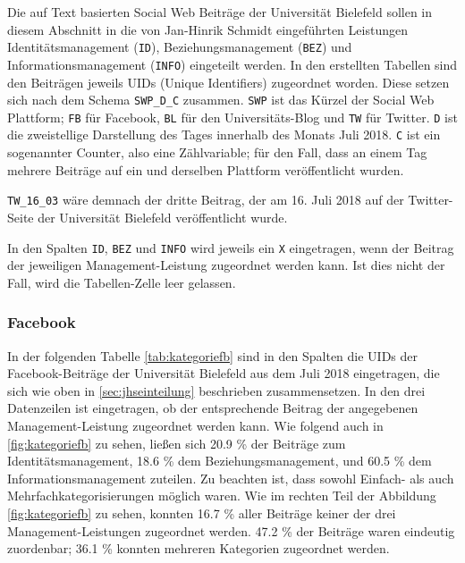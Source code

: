 Die auf Text basierten Social Web Beiträge der Universität Bielefeld sollen in diesem Abschnitt in die von Jan-Hinrik Schmidt eingeführten Leistungen Identitätsmanagement (\texttt{ID}), Beziehungsmanagement (\texttt{BEZ}) und Informationsmanagement (\texttt{INFO}) eingeteilt werden. In den erstellten Tabellen sind den Beiträgen jeweils UIDs (Unique Identifiers) zugeordnet worden. Diese setzen sich nach dem Schema \texttt{SWP\_D\_C} zusammen. \texttt{SWP} ist das Kürzel der Social Web Plattform; \texttt{FB} für Facebook, \texttt{BL} für den Universitäts-Blog und \texttt{TW} für Twitter. \texttt{D} ist die zweistellige Darstellung des Tages innerhalb des Monats Juli 2018. \texttt{C} ist ein sogenannter Counter, also eine Zählvariable; für den Fall, dass an einem Tag mehrere Beiträge auf ein und derselben Plattform veröffentlicht wurden.

\texttt{TW\_16\_03} wäre demnach der dritte Beitrag, der am 16. Juli 2018 auf der Twitter-Seite der Universität Bielefeld veröffentlicht wurde.

In den Spalten \texttt{ID}, \texttt{BEZ} und \texttt{INFO} wird jeweils ein \texttt{X} eingetragen, wenn der Beitrag der jeweiligen Management-Leistung zugeordnet werden kann. Ist dies nicht der Fall, wird die Tabellen-Zelle leer gelassen.

\subsubsection{Facebook}

In der folgenden Tabelle \ref{tab:kategoriefb} sind in den Spalten die UIDs der Facebook-Beiträge der Universität Bielefeld aus dem Juli 2018 eingetragen, die sich wie oben in \ref{sec:jhseinteilung} beschrieben zusammensetzen. In den drei Datenzeilen ist eingetragen, ob der entsprechende Beitrag der angegebenen Management-Leistung zugeordnet werden kann. Wie folgend auch in \ref{fig:kategoriefb} zu sehen, ließen sich 20.9 \% der Beiträge zum Identitätsmanagement, 18.6 \% dem Beziehungsmanagement, und 60.5 \% dem Informationsmanagement zuteilen. Zu beachten ist, dass sowohl Einfach- als auch Mehrfachkategorisierungen möglich waren. Wie im rechten Teil der Abbildung \ref{fig:kategoriefb} zu sehen, konnten 16.7 \% aller Beiträge keiner der drei Management-Leistungen zugeordnet werden. 47.2 \% der Beiträge waren eindeutig zuordenbar; 36.1 \% konnten mehreren Kategorien zugeordnet werden.

